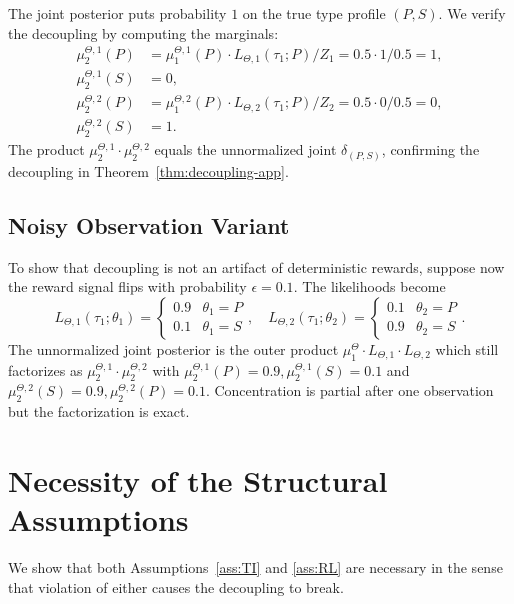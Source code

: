 The joint posterior puts probability $1$ on the true type profile $(P, S)$. We verify the decoupling by computing the marginals:
\begin{align}
\mu_2^{\Theta,1}(P) &= \mu_1^{\Theta,1}(P) \cdot L_{\Theta,1}(\tau_1; P) / Z_1 = 0.5 \cdot 1 / 0.5 = 1, \\
\mu_2^{\Theta,1}(S) &= 0, \\
\mu_2^{\Theta,2}(P) &= \mu_1^{\Theta,2}(P) \cdot L_{\Theta,2}(\tau_1; P) / Z_2 = 0.5 \cdot 0 / 0.5 = 0, \\
\mu_2^{\Theta,2}(S) &= 1.
\end{align}
The product $\mu_2^{\Theta,1} \cdot \mu_2^{\Theta,2}$ equals the unnormalized joint $\delta_{(P,S)}$, confirming the decoupling in Theorem~\ref{thm:decoupling-app}.

\subsection{Noisy Observation Variant}

To show that decoupling is not an artifact of deterministic rewards, suppose now the reward signal flips with probability $\epsilon = 0.1$. The likelihoods become
\begin{equation}
L_{\Theta,1}(\tau_1; \theta_1) = \begin{cases} 0.9 & \theta_1 = P \\ 0.1 & \theta_1 = S \end{cases}, \quad
L_{\Theta,2}(\tau_1; \theta_2) = \begin{cases} 0.1 & \theta_2 = P \\ 0.9 & \theta_2 = S \end{cases}.
\end{equation}
The unnormalized joint posterior is the outer product $\mu_1^\Theta \cdot L_{\Theta,1} \cdot L_{\Theta,2}$ which still factorizes as $\mu_2^{\Theta,1} \cdot \mu_2^{\Theta,2}$ with $\mu_2^{\Theta,1}(P) = 0.9, \mu_2^{\Theta,1}(S) = 0.1$ and $\mu_2^{\Theta,2}(S) = 0.9, \mu_2^{\Theta,2}(P) = 0.1$. Concentration is partial after one observation but the factorization is exact.

\section{Necessity of the Structural Assumptions}
\label{sec:necessity}

We show that both Assumptions~\ref{ass:TI} and \ref{ass:RL} are necessary in the sense that violation of either causes the decoupling to break.

